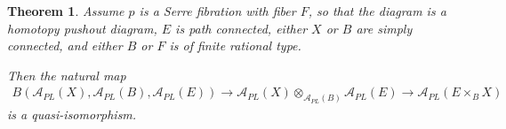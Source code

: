 \documentclass{scrartcl}
\theoremstyle{plain}
\newtheorem{theorem}{Theorem}[section]
\theoremstyle{definition}
\newcommand{\Apl}{\mathcal A_{PL}}
\newcommand{\from}{\leftarrow}
\begin{document}
    
\begin{theorem}\label{thm:pullback-pushout}
Assume $p$ is a Serre fibration with fiber $F$, so that the diagram is a homotopy pushout diagram, $E$ is path connected, either $X$ or $B$ are simply connected, and either $B$ or $F$ is of finite rational type. 

Then the natural map
\begin{align*}
    B(\Apl(X),\Apl(B), \Apl(E)) \to \Apl(X) \otimes_{\Apl(B) }\Apl(E) \to \Apl(E\times_B X)
\end{align*}
is a quasi-isomorphism. 
\end{theorem}
\end{document}

